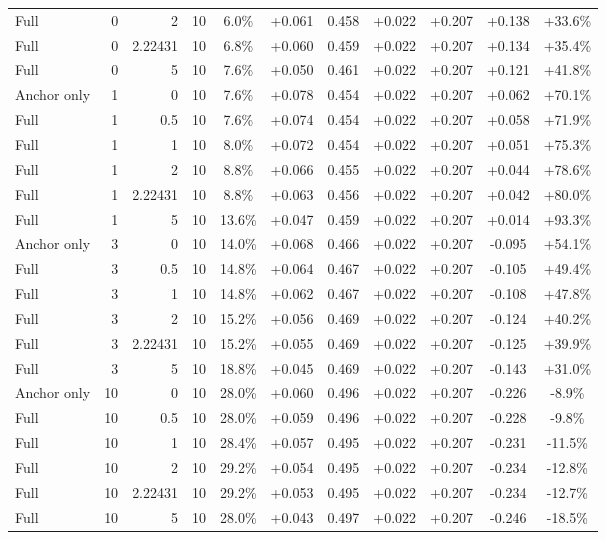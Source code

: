 \begin{table}[htbp]
\begin{tabular}{lrrrccccccc}
Full & 0 & 2 & 10 & 6.0\% & +0.061 & 0.458 & +0.022 & +0.207 & +0.138 & +33.6\% \\
Full & 0 & 2.22431 & 10 & 6.8\% & +0.060 & 0.459 & +0.022 & +0.207 & +0.134 & +35.4\% \\
Full & 0 & 5 & 10 & 7.6\% & +0.050 & 0.461 & +0.022 & +0.207 & +0.121 & +41.8\% \\
Anchor only & 1 & 0 & 10 & 7.6\% & +0.078 & 0.454 & +0.022 & +0.207 & +0.062 & +70.1\% \\
Full & 1 & 0.5 & 10 & 7.6\% & +0.074 & 0.454 & +0.022 & +0.207 & +0.058 & +71.9\% \\
Full & 1 & 1 & 10 & 8.0\% & +0.072 & 0.454 & +0.022 & +0.207 & +0.051 & +75.3\% \\
Full & 1 & 2 & 10 & 8.8\% & +0.066 & 0.455 & +0.022 & +0.207 & +0.044 & +78.6\% \\
Full & 1 & 2.22431 & 10 & 8.8\% & +0.063 & 0.456 & +0.022 & +0.207 & +0.042 & +80.0\% \\
Full & 1 & 5 & 10 & 13.6\% & +0.047 & 0.459 & +0.022 & +0.207 & +0.014 & +93.3\% \\
Anchor only & 3 & 0 & 10 & 14.0\% & +0.068 & 0.466 & +0.022 & +0.207 & -0.095 & +54.1\% \\
Full & 3 & 0.5 & 10 & 14.8\% & +0.064 & 0.467 & +0.022 & +0.207 & -0.105 & +49.4\% \\
Full & 3 & 1 & 10 & 14.8\% & +0.062 & 0.467 & +0.022 & +0.207 & -0.108 & +47.8\% \\
Full & 3 & 2 & 10 & 15.2\% & +0.056 & 0.469 & +0.022 & +0.207 & -0.124 & +40.2\% \\
Full & 3 & 2.22431 & 10 & 15.2\% & +0.055 & 0.469 & +0.022 & +0.207 & -0.125 & +39.9\% \\
Full & 3 & 5 & 10 & 18.8\% & +0.045 & 0.469 & +0.022 & +0.207 & -0.143 & +31.0\% \\
Anchor only & 10 & 0 & 10 & 28.0\% & +0.060 & 0.496 & +0.022 & +0.207 & -0.226 & -8.9\% \\
Full & 10 & 0.5 & 10 & 28.0\% & +0.059 & 0.496 & +0.022 & +0.207 & -0.228 & -9.8\% \\
Full & 10 & 1 & 10 & 28.4\% & +0.057 & 0.495 & +0.022 & +0.207 & -0.231 & -11.5\% \\
Full & 10 & 2 & 10 & 29.2\% & +0.054 & 0.495 & +0.022 & +0.207 & -0.234 & -12.8\% \\
Full & 10 & 2.22431 & 10 & 29.2\% & +0.053 & 0.495 & +0.022 & +0.207 & -0.234 & -12.7\% \\
Full & 10 & 5 & 10 & 28.0\% & +0.043 & 0.497 & +0.022 & +0.207 & -0.246 & -18.5\% \\

\end{tabular}
\end{table}
